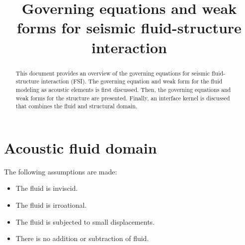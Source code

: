 \documentclass[3p]{elsarticle}
\begin{document}
\begin{frontmatter}

\title{Governing equations and weak forms for seismic fluid-structure interaction}


\begin{abstract}
This document provides an overview of the governing equations for seismic fluid-structure interaction (FSI). The governing equation and weak form for the fluid modeling as acoustic elements is first discussed. Then, the governing equations and weak forms for the structure are presented. Finally, an interface kernel is discussed that combines the fluid and structural domain.
\end{abstract}


\end{frontmatter}


\section{Acoustic fluid domain}

\noindent The following assumptions are made:
\begin{itemize}
    \item The fluid is inviscid.
    \item The fluid is irroational.
    \item The fluid is subjected to small displacements.
    \item There is no addition or subtraction of fluid.
\end{itemize}
\end{document}
